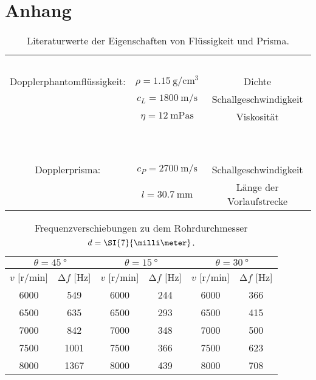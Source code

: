 \section{Anhang}

\begin{table}
    \centering
    \caption{Literaturwerte der Eigenschaften von Flüssigkeit und Prisma. \cite{skript}}
    \label{tab:lit}
    \begin{tabular}{c c c}
        \toprule
        ~  & ~ & ~\\
        Dopplerphantomflüssigkeit: & $\rho = \SI{1.15}{\gram\per\centi\meter\tothe{3}}$ & Dichte \\
        ~  &  $c_{L} = \SI{1800}{\meter\per\second}$  & Schallgeschwindigkeit \\
        ~ & $\eta = \SI{12}{\milli\pascal\second}$ & Viskosität \\
        ~ & ~ & ~ \\
        \midrule
        ~ & ~ & ~ \\
        Dopplerprisma: & $c_{P} = \SI{2700}{\meter\per\second}$  & Schallgeschwindigkeit \\
        ~ & $l = \SI{30.7}{\milli\meter}$ & Länge der Vorlaufstrecke
    \end{tabular}
\end{table}

\begin{table}
    \centering
    \caption{Frequenzverschiebungen zu dem Rohrdurchmesser $\protect d = \SI{7}{\milli\meter}$.}
    \label{tab:1}
    \begin{tabular}{c c || c c || c c}
        \hline
        \multicolumn{2}{c}{$\theta = \SI{45}{\degree}$} & \multicolumn{2}{c}{$\theta = \SI{15}{\degree}$} & \multicolumn{2}{c}{$\theta = \SI{30}{\degree}$}\\
        \midrule
        $v$ [$\si{{\text{r}}\per\minute}$]  & $\increment f$ [$\si{\hertz}$] & $v$ [$\si{{\text{r}}\per\minute}$]  & $\increment f$ [$\si{\hertz}$]&  $v$ [$\si{{\text{r}}\per\minute}$]  & $\increment f$ [$\si{\hertz}$]\\
        \midrule
        6000    &   549     & 6000  & 244  & 6000 & 366  \\ 
        6500    &   635     & 6500  & 293  & 6500 & 415  \\ 
        7000    &   842     & 7000  & 348  & 7000 & 500  \\ 
        7500    &   1001    & 7500  & 366  & 7500 & 623  \\ 
        8000    &   1367    & 8000  & 439  & 8000 & 708  \\  
        \bottomrule
    \end{tabular}
\end{table}

